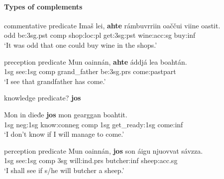 \documentclass[a4,12pt]{scrartcl}
\begin{document}
\paragraph{Types of complements}%
\begin{exe}
	\ex  commentative predicate \label{ahteSubject} \citep[194]{nickel1994} 
	\gll 	Imaš 	lei, 	{\bf ahte} 	rámbuvrriin 	oaččui 	viine 	oastit.\\
	odd 	be:{\sc 3sg.pst} {\sc comp} shop:{\sc loc:pl} get:{\sc 3sg:pst} wine:{\sc acc:sg} buy:{\sc inf}\\
	\glt 	‘It was odd that one could buy wine in the shops.’
	
	\ex preception predicate \label{ahteObject} \citep[194]{nickel1994}
	\gll 	Mun 	oainnán, 	{\bf ahte} 	áddjá 	lea 	boahtán.\\
	{\sc 1sg} see:{\sc 1sg} {\sc comp} grand\_father be:{\sc 3sg.prs} come:{\sc pastpart}\\%
	\glt 	‘I see that grandfather has come.’
	
		 \ex knowledge predicate? \textbf{jos} \label{josObjekt}
	 	\begin{xlist}
		\ex 	
		\gll Mon in dieđe {\bf jos} mon gearggan boahtit.\\
		{\sc 1sg} {\sc neg:1sg} know:{\sc conneg} {\sc comp} {\sc 1sg} get\_ready:{\sc 1sg} come:{\sc inf}\\
		\glt ‘I don't know if I will manage to come.’ %
		
		\ex perception predicate
		\gll 	Mun 	oainnán, 	{\bf jos}  son áigu njuovvat sávzza.\\
		{\sc 1sg} see:{\sc 1sg} {\sc comp} {\sc 3sg} will:{\sc ind.prs} butcher:{\sc inf} sheep:{\sc acc.sg}\\
		\glt 	‘I shall see if s/he will butcher a sheep.’
		\end{xlist}	

%
%
%
	

\end{exe}
\end{document}

